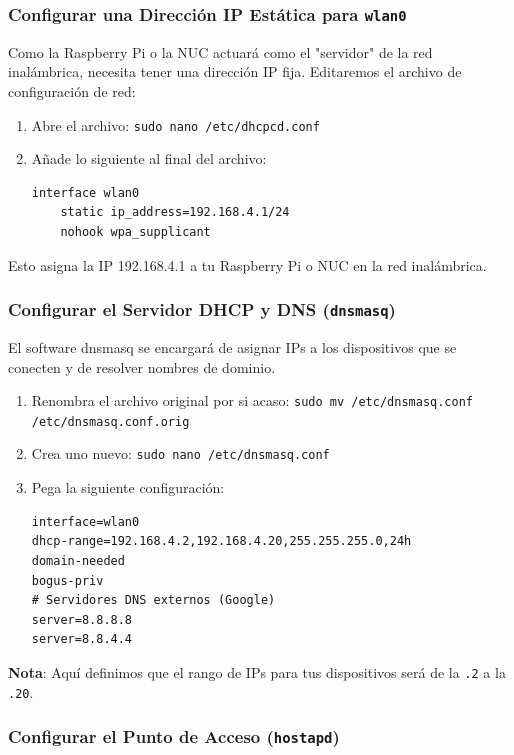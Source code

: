 \subsubsection{Configurar una Dirección IP Estática para \texttt{wlan0}}

Como la Raspberry Pi o la NUC actuará como el "servidor" de la red
inalámbrica, necesita tener una dirección IP fija. Editaremos el
archivo de configuración de red:

\begin{enumerate}
	\item Abre el archivo: \texttt{sudo nano /etc/dhcpcd.conf}
  \item Añade lo siguiente al final del archivo:
\begin{lstlisting}
interface wlan0
    static ip_address=192.168.4.1/24
    nohook wpa_supplicant
\end{lstlisting}
\end{enumerate}

Esto asigna la IP 192.168.4.1 a tu Raspberry Pi o NUC en la red inalámbrica.

\subsubsection{Configurar el Servidor DHCP y DNS (\texttt{dnsmasq})}

El software dnsmasq se encargará de asignar IPs a los dispositivos
que se conecten y de resolver nombres de dominio.

\begin{enumerate}
	\item Renombra el archivo original por si acaso:
		\texttt{sudo mv /etc/dnsmasq.conf /etc/dnsmasq.conf.orig}
	\item Crea uno nuevo: \texttt{sudo nano /etc/dnsmasq.conf}
	\item Pega la siguiente configuración:
\begin{lstlisting}
interface=wlan0
dhcp-range=192.168.4.2,192.168.4.20,255.255.255.0,24h
domain-needed
bogus-priv
# Servidores DNS externos (Google)
server=8.8.8.8
server=8.8.4.4
\end{lstlisting}
\end{enumerate}
\textbf{Nota}: Aquí definimos que el rango de IPs para tus dispositivos
será de la \texttt{.2} a la \texttt{.20}.

\subsubsection{Configurar el Punto de Acceso (\texttt{hostapd})}

